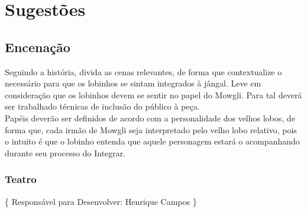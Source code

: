 \chapter[Sugestões]{Sugestões}
\label{chap:sugestoes}
	\section[Encenação]{Encenação}
	\label{sec:sugestoes_encenacao}
		Seguindo a história, divida as cenas relevantes, de forma que contextualize o necessário para que os lobinhos se sintam integrados à jângal. Leve em consideração que os lobinhos devem se sentir no papel do Mowgli. Para tal deverá ser trabalhado técnicas de inclusão do público à peça.
		\\ \indent Papéis deverão ser definidos de acordo com a personalidade dos velhos lobos, de forma que, cada irmão de Mowgli seja interpretado pelo velho lobo relativo, pois o intuito é que o lobinho entenda que aquele personagem estará o acompanhando durante seu processo do Integrar.

		\subsection[Teatro]{Teatro}
		\label{subsec:sugestoes_encenacao_teatro}
			\{ Responsável para Desenvolver: Henrique Campos \}

